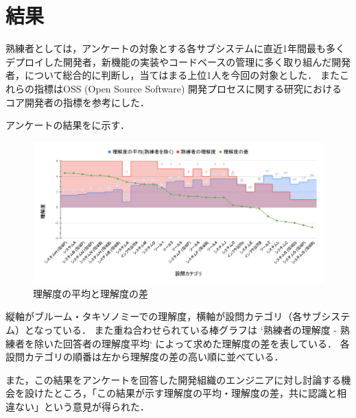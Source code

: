 \section{結果}
熟練者としては，アンケートの対象とする各サブシステムに直近1年間最も多くデプロイした開発者，新機能の実装やコードベースの管理に多く取り組んだ開発者，について総合的に判断し，当てはまる上位1人を今回の対象とした．
またこれらの指標はOSS (Open Source Software) 開発プロセスに関する研究\cite{bib:mockus}におけるコア開発者の指標を参考にした．

アンケートの結果をに示す．

\begin{figure}[h]
	\centering
	\includegraphics[keepaspectratio,width=0.9\linewidth]{img/rikai.png}
	\caption{理解度の平均と理解度の差}
	\label{img:rikai}
\end{figure}

縦軸がブルーム・タキソノミーでの理解度，横軸が設問カテゴリ（各サブシステム）となっている．
また重ね合わせられている棒グラフは `熟練者の理解度 - 熟練者を除いた回答者の理解度平均` によって求めた理解度の差を表している．
各設問カテゴリの順番は左から理解度の差の高い順に並べている．

また，この結果をアンケートを回答した開発組織のエンジニアに対し討論する機会を設けたところ，「この結果が示す理解度の平均・理解度の差，共に認識と相違ない」という意見が得られた．
